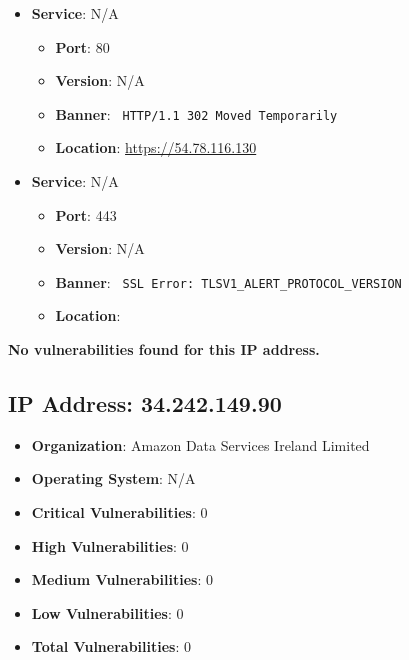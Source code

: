 \documentclass{article}
\begin{document}
\begin{itemize}
    
        \item \textbf{Service}: N/A
        \begin{itemize}
            \item \textbf{Port}: 80
            \item \textbf{Version}:  N/A 
            \item \textbf{Banner}: \texttt{
                HTTP/1.1 302 Moved Temporarily
            }
            \item \textbf{Location}: \href{ https://54.78.116.130 }{ https://54.78.116.130 }
        \end{itemize}
    
        \item \textbf{Service}: N/A
        \begin{itemize}
            \item \textbf{Port}: 443
            \item \textbf{Version}:  N/A 
            \item \textbf{Banner}: \texttt{
                SSL Error: TLSV1\_ALERT\_PROTOCOL\_VERSION
            }
            \item \textbf{Location}: \href{  }{  }
        \end{itemize}
    
\end{itemize}


\textbf{No vulnerabilities found for this IP address.}




\clearpage



\subsection*{IP Address: 34.242.149.90}

\begin{itemize}
    \item \textbf{Organization}: Amazon Data Services Ireland Limited
    \item \textbf{Operating System}:  N/A 
    \item \textbf{Critical Vulnerabilities}: 0
    \item \textbf{High Vulnerabilities}: 0
    \item \textbf{Medium Vulnerabilities}: 0
    \item \textbf{Low Vulnerabilities}: 0
    \item \textbf{Total Vulnerabilities}: 0
\end{itemize}
\end{document}
